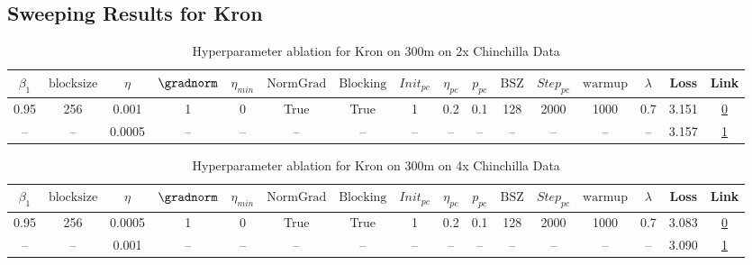 \subsection{Sweeping Results for Kron}%
\begin{table}[H]
\centering
\caption{Hyperparameter ablation for Kron on 300m on 2x Chinchilla Data}
\label{tab:ablation_kron_300m_on_2x_chinchilla_data}
\begin{tabular}{cccccccccccccccc}
\toprule
$\beta_1$ & $\mathrm{block size}$ & $\eta$ & $\gradnorm$ & $\eta_{min}$ & $\mathrm{NormGrad}$ & $\mathrm{Blocking}$ & $Init_{pc}$ & $\eta_{pc}$ & $p_{pc}$ & $\mathrm{BSZ}$ & $Step_{pc}$ & $\mathrm{warmup}$ & $\lambda$ & Loss & Link \\
\midrule
0.95 & 256 & 0.001 & 1 & 0 & True & True & 1 & 0.2 & 0.1 & 128 & 2000 & 1000 & 0.7 & 3.151 & \href{https://wandb.ai/stanford-mercury/optimizer-scaling/runs/sweep-300m-12B-kronb21812lr0.001-wd0.7-b10.95-plr0.2-pis1-gn1-no-48c292}{0} \\
\midrule
-- & -- & 0.0005 & -- & -- & -- & -- & -- & -- & -- & -- & -- & -- & -- & 3.157 & \href{https://wandb.ai/stanford-mercury/optimizer-scaling/runs/sweep-300m-12B-kron7436a9lr0.0005-wd0.7-b10.95-plr0.2-pis1-gn1-n-68efd2}{1} \\
\bottomrule
\end{tabular}
\end{table}

\begin{table}[H]
\centering
\caption{Hyperparameter ablation for Kron on 300m on 4x Chinchilla Data}
\label{tab:ablation_kron_300m_on_4x_chinchilla_data}
\begin{tabular}{cccccccccccccccc}
\toprule
$\beta_1$ & $\mathrm{block size}$ & $\eta$ & $\gradnorm$ & $\eta_{min}$ & $\mathrm{NormGrad}$ & $\mathrm{Blocking}$ & $Init_{pc}$ & $\eta_{pc}$ & $p_{pc}$ & $\mathrm{BSZ}$ & $Step_{pc}$ & $\mathrm{warmup}$ & $\lambda$ & Loss & Link \\
\midrule
0.95 & 256 & 0.0005 & 1 & 0 & True & True & 1 & 0.2 & 0.1 & 128 & 2000 & 1000 & 0.7 & 3.083 & \href{https://wandb.ai/stanford-mercury/optimizer-scaling/runs/sweep-300m-24B-kronb55572lr0.0005-wd0.7-b10.95-plr0.2-pis1-gn1-n-9479df}{0} \\
\midrule
-- & -- & 0.001 & -- & -- & -- & -- & -- & -- & -- & -- & -- & -- & -- & 3.090 & \href{https://wandb.ai/stanford-mercury/optimizer-scaling/runs/sweep-300m-24B-kron7aa525lr0.001-wd0.7-b10.95-plr0.2-pis1-gn1-no-127f30}{1} \\
\bottomrule
\end{tabular}
\end{table}

